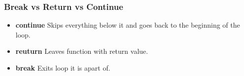 \documentclass{beamer}
\begin{document}
%
%
\begin{frame}[fragile]
  \frametitle{Break vs Return vs Continue}
  \begin{itemize}
    \item \textbf{continue} \textrightarrow Skips everything below it and goes back to the beginning of the loop.
    \item \textbf{reuturn} \textrightarrow Leaves function with return value.
    \item \textbf{break} \textrightarrow Exits loop it is apart of.
    \end{itemize}
\end{frame}
\end{document}
